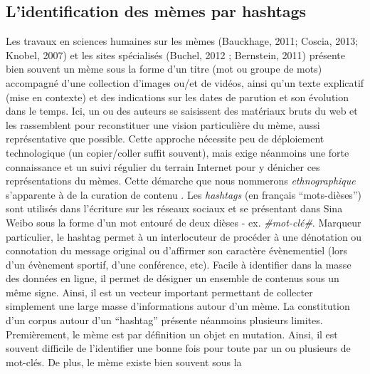 \subsection[ L{\textquoteright}identification des m\`emes par hashtags ]{L{\textquoteright}identification des m\`emes par hashtags }
Les travaux en sciences humaines sur les m\`emes (Bauckhage, 2011;
Coscia, 2013; Knobel, 2007) et les sites sp\'ecialis\'es (Buchel, 2012
; Bernstein, 2011) pr\'esente bien souvent un m\`eme sous la forme
d{\textquoteright}un titre (mot ou groupe de mots) accompagn\'e
d{\textquoteright}une collection d{\textquoteright}images ou/et de
vid\'eos, ainsi qu{\textquoteright}un texte explicatif (mise en
contexte) et des indications sur les dates de parution et son
\'evolution dans le temps. Ici, un ou des auteurs se saisissent des
mat\'eriaux bruts du web et les rassemblent pour reconstituer une
vision particuli\`ere du m\`eme, aussi repr\'esentative que possible.
Cette approche n\'ecessite peu de d\'eploiement technologique (un
copier/coller suffit souvent), mais exige n\'eanmoins une forte
connaissance et un suivi r\'egulier du terrain Internet pour y
d\'enicher ces repr\'esentations du m\`emes. Cette d\'emarche que nous
nommerons \textit{ethnographique }s{\textquoteright}apparente \`a de la
curation de contenu \cite{Buckingham2006}. Les \textit{hashtags }(en
fran\c{c}ais {\textquotedblleft}mots-di\`eses{\textquotedblright}) sont
utilis\'es dans l{\textquoteright}\'ecriture sur les r\'eseaux sociaux
et se pr\'esentant dans Sina Weibo sous la forme d{\textquoteright}un
mot entour\'e de deux di\`eses - ex. \textit{\#mot-cl\'e\#}. Marqueur
particulier, le hashtag permet \`a un interlocuteur de proc\'eder \`a
une d\'enotation ou connotation du message original \cite{Romero2011} ou
d{\textquoteright}affirmer son caract\`ere \'ev\`enementiel (lors
d{\textquoteright}un \'ev\`enement sportif, d{\textquoteright}une
conf\'erence, etc). Facile \`a identifier dans la masse des donn\'ees
en ligne, il permet de d\'esigner un ensemble de contenus sous un
m\^eme signe. Ainsi, il est un vecteur important permettant de
collecter simplement une large masse d{\textquoteright}informations
autour d{\textquoteright}un m\`eme. La constitution
d{\textquoteright}un corpus autour d{\textquoteright}un
{\textquotedblleft}hashtag{\textquotedblright} pr\'esente n\'eanmoins
plusieurs limites. Premi\`erement, le m\`eme est par d\'efinition un
objet en mutation. Ainsi, il est souvent difficile de
l{\textquoteright}identifier une bonne fois pour toute par un ou
plusieurs de mot-cl\'es. De plus, le m\`eme existe bien souvent sous la
